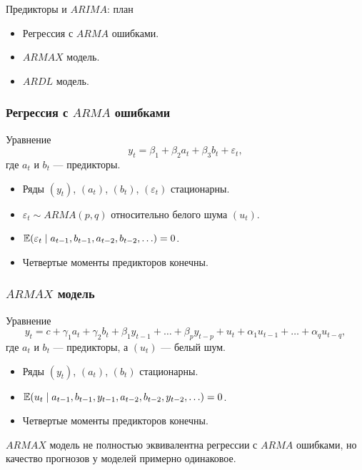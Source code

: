 
\begin{frame} %


\end{frame}

\begin{frame}{Предикторы и $ARIMA$: план}
  \begin{itemize}[<+->]
    \item Регрессия с $ARMA$ ошибками.
    \item $ARMAX$ модель.
    \item $ARDL$ модель.
  \end{itemize}
\end{frame}

\begin{frame}
  \frametitle{Регрессия с $ARMA$ ошибками}
  
  \begin{block}{Уравнение}
    \[
      y_t = \beta_1 + \beta_2 a_t + \beta_3 b_t + \varepsilon_t,
    \]
  где $a_t$ и $b_t$ — \alert{предикторы}.
  \end{block}
  \pause
  \begin{itemize}
  \item Ряды $(y_t)$, $(a_t)$, $(b_t)$, $(\varepsilon_t)$ \alert{стационарны}.
  \item $\varepsilon_t \sim ARMA(p, q)$ относительно белого шума $(u_t)$.
\item $\mathbb{E}(\varepsilon_t \mid a_{t-1}, b_{t-1}, a_{t-2}, b_{t-2}, \ldots) = 0$.
\item Четвертые моменты предикторов конечны.  
\end{itemize}
  
\end{frame}


\begin{frame}
  \frametitle{$ARMAX$ модель}

  \begin{block}{Уравнение}
    \[
      y_t = c + \gamma_1 a_t + \gamma_2 b_t + \beta_1 y_{t-1} + \ldots + \beta_p y_{t-p} + u_t + \alpha_1 u_{t-1} + \ldots + \alpha_q u_{t-q},
    \]
  где $a_t$ и $b_t$ — \alert{предикторы}, а $(u_t)$ — \alert{белый шум}.
  \end{block}
\pause
  \begin{itemize}[<+->]
  \item Ряды $(y_t)$, $(a_t)$, $(b_t)$ \alert{стационарны}.
\item $\mathbb{E}(u_t \mid a_{t-1}, b_{t-1}, y_{t-1}, a_{t-2}, b_{t-2}, y_{t-2}, \ldots) = 0$.
\item Четвертые моменты предикторов конечны.  
\end{itemize}
  \pause
  $ARMAX$ модель не полностью эквивалентна регрессии с $ARMA$ ошибками, но качество прогнозов у моделей примерно одинаковое.  

\end{frame}


